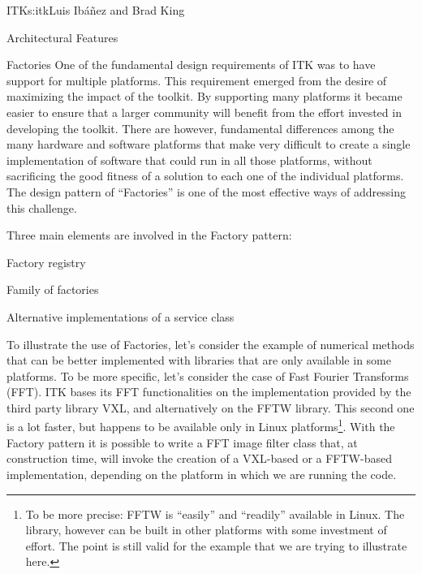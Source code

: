 \begin{aosachapter}{ITK}{s:itk}{Luis Ib\'{a}\~{n}ez and Brad King}
\begin{aosasect1}{Architectural Features}
\begin{aosasect2}{Factories}
One of the fundamental design requirements of ITK was to have support for
multiple platforms. This requirement emerged from the desire of maximizing the
impact of the toolkit. By supporting many platforms it became easier to ensure
that a larger community will benefit from the effort invested in developing the
toolkit. There are however, fundamental differences among the many hardware and
software platforms that make very difficult to create a single implementation
of software that could run in all those platforms, without sacrificing the good
fitness of a solution to each one of the individual platforms. The design
pattern of ``Factories'' is one of the most effective ways of addressing this
challenge.

Three main elements are involved in the Factory pattern:

\begin{aosaitemize}
\item Factory registry
\item Family of factories
\item Alternative implementations of a service class
\end{aosaitemize}


To illustrate the use of Factories, let's consider the example of numerical
methods that can be better implemented with libraries that are only available
in some platforms. To be more specific, let's consider the case of Fast Fourier
Transforms (FFT). ITK bases its FFT functionalities on the implementation
provided by the third party library VXL, and alternatively on the FFTW library.
This second one is a lot faster, but happens to be available only in Linux
platforms\footnote{To be more precise: FFTW is ``easily'' and ``readily''
available in Linux. The library, however can be built in other platforms with
some investment of effort. The point is still valid for the example that we are
trying to illustrate here.}. With the Factory pattern it is possible to write a
FFT image filter class that, at construction time, will invoke the creation of
a VXL-based or a FFTW-based implementation, depending on the platform in which
we are running the code.


\end{aosasect2}
\end{aosasect1}
\end{aosachapter}
